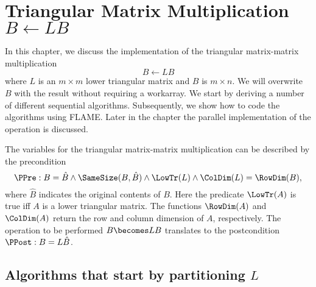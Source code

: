 %
%


\chapter{Triangular Matrix Multiplication\\
$ B \leftarrow L B $}
\label{chapter:trmm_lln}





In this chapter, we discuss the implementation of the triangular
matrix-matrix multiplication
\[
B \leftarrow L B
\]
where $ L $ is an $ m \times m $ lower triangular matrix and $ B $ is
$ m \times n $.  We will overwrite $ B $ with the result without
requiring a workarray.  We start by deriving a number of different
sequential algorithms.  Subsequently, we show how to code the
algorithms using FLAME.  Later in the chapter the parallel
implementation of the operation is discussed.

The variables for the triangular matrix-matrix multiplication can be
described by the precondition
\[
\PPre:
B = \hat{B} \wedge \SameSize( B, \hat{B} ) \wedge \LowTr( L ) \wedge
\ColDim( L )=\RowDim( B ),
\]
where $ \hat{B} $ indicates the original contents of $ B $.  Here the
predicate $ \LowTr( A ) $ is true iff $ A $ is a lower triangular
matrix.  The functions $ \RowDim( A ) $ and $ \ColDim( A ) $ return
the row and column dimension of $ A $, respectively.  The operation to
be performed $ B \becomes L B $ translates to the postcondition $
\PPost: B = L \hat{B} $.


\section{Algorithms that start by partitioning $ L $}
\label{sec:trmm_lln:L}

